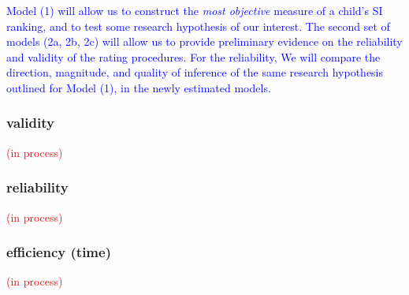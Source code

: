 \textcolor{blue}{Model (1) will allow us to construct the \textit{most objective} measure of a child's SI ranking, and to test some research hypothesis of our interest. 
%
The second set of models (2a, 2b, 2c) will allow us to provide preliminary evidence on the reliability and validity of the rating procedures. For the reliability, We will compare 
%
the direction, magnitude, and quality of inference of the same research hypothesis outlined for Model (1), in the newly estimated models.
}
%
%
\subsubsection{validity}
%
\textcolor{red}{(in process)}

\begin{comment}
	correlate latent scores (from different methods) with entropy measures (see research proposal)
	
	\textbf{critique:} What about decision statements or think at loud rating process? (is it possible), \citet{Lesterhuis_2018} has shown their usefulness, while \citet{Boonen_et_al_2020} signals the need to know about the inner working of judgment processes.
\end{comment}
%
%
\subsubsection{reliability}
%
\textcolor{red}{(in process)}

\begin{comment}
	compare the Scale Separation Reliability (SSR, an inter-rater reliability measure), coming from CJ methods, with others for other methods
	
	- No intra-rater reliability, also known as test-retest reliability (Verhavert_2018, Reliability_wiki_2022) 
	- No Inter-method reliability,  assesses the degree to which test scores are consistent when there is a variation in the methods or instruments used (Verhavert_2018, Reliability_wiki_2022) 
	- No comparison of SSR vs the true correlation of the latent scale and entropy measures 
	* Justification: (Verhavert_2018, p. 156) " simulation studies could resolve the inconclusiveness regarding the SSR as a correlation with the truth."
\end{comment}
%
%
\subsubsection{efficiency (time)}
%
\textcolor{red}{(in process)}

